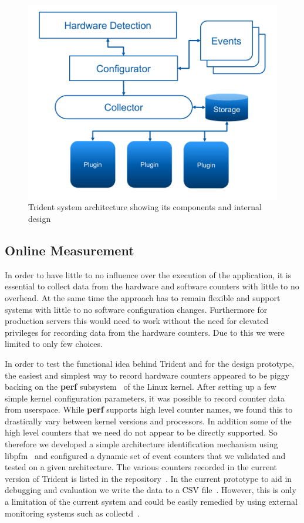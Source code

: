 \documentclass{webofc}
\begin{document}
\begin{figure}
  \centering
	\captionsetup{justification=centering}
  \includegraphics[width=0.5\linewidth]{Design.pdf}
	\setlength{\belowcaptionskip}{-10pt}
\caption{Trident system architecture showing its components and internal design}
\label{fig:design}
\end{figure}

\subsection{Online Measurement}

In order to have little to no influence over the execution of the application, it is essential to collect data from the hardware and software counters with little to no overhead. At the same time the approach has to remain flexible and support systems with little to no software configuration changes. Furthermore for production servers this would need to work without the need for elevated privileges for recording data from the hardware counters. Due to this we were limited to only few choices. 

In order to test the functional idea behind Trident and for the design prototype, the easiest and simplest way to record hardware counters appeared to be piggy backing on the \textbf{perf} subsystem~\cite{} of the Linux kernel. After setting up a few simple kernel configuration parameters, it was possible to record counter data from userspace. While \textbf{perf} supports high level counter names, we found this to drastically vary between kernel versions and processors. In addition some of the high level counters that we need do not appear to be directly supported. So therefore we developed a simple architecture identification mechanism using libpfm~\cite{} and configured a dynamic set of event counters that we validated and tested on a given architecture. The various counters recorded in the current version of Trident is listed in the repository~\cite{}. In the current prototype to aid in debugging and evaluation we write the data to a CSV file~\cite{}. However, this is only a limitation of the current system and could be easily remedied by using external monitoring systems such as collectd~\cite{}.
\end{document}
